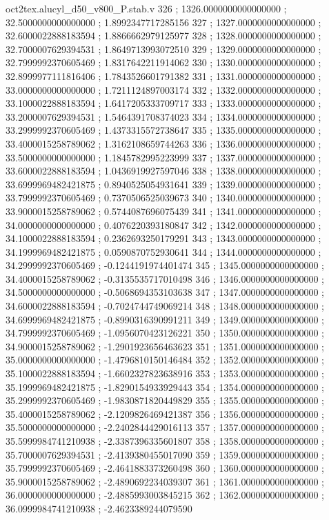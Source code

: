 \begin{filecontents}[overwrite]{oct2tex.alucyl_d50_v800_P.stab.v}
326 ; 1326.0000000000000000 ; 32.5000000000000000 ; 1.8992347717285156
327 ; 1327.0000000000000000 ; 32.6000022888183594 ; 1.8866662979125977
328 ; 1328.0000000000000000 ; 32.7000007629394531 ; 1.8649713993072510
329 ; 1329.0000000000000000 ; 32.7999992370605469 ; 1.8317642211914062
330 ; 1330.0000000000000000 ; 32.8999977111816406 ; 1.7843526601791382
331 ; 1331.0000000000000000 ; 33.0000000000000000 ; 1.7211124897003174
332 ; 1332.0000000000000000 ; 33.1000022888183594 ; 1.6417205333709717
333 ; 1333.0000000000000000 ; 33.2000007629394531 ; 1.5464391708374023
334 ; 1334.0000000000000000 ; 33.2999992370605469 ; 1.4373315572738647
335 ; 1335.0000000000000000 ; 33.4000015258789062 ; 1.3162108659744263
336 ; 1336.0000000000000000 ; 33.5000000000000000 ; 1.1845782995223999
337 ; 1337.0000000000000000 ; 33.6000022888183594 ; 1.0436919927597046
338 ; 1338.0000000000000000 ; 33.6999969482421875 ; 0.8940525054931641
339 ; 1339.0000000000000000 ; 33.7999992370605469 ; 0.7370506525039673
340 ; 1340.0000000000000000 ; 33.9000015258789062 ; 0.5744087696075439
341 ; 1341.0000000000000000 ; 34.0000000000000000 ; 0.4076220393180847
342 ; 1342.0000000000000000 ; 34.1000022888183594 ; 0.2362693250179291
343 ; 1343.0000000000000000 ; 34.1999969482421875 ; 0.0590870752930641
344 ; 1344.0000000000000000 ; 34.2999992370605469 ; -0.1244191974401474
345 ; 1345.0000000000000000 ; 34.4000015258789062 ; -0.3135535717010498
346 ; 1346.0000000000000000 ; 34.5000000000000000 ; -0.5068694353103638
347 ; 1347.0000000000000000 ; 34.6000022888183594 ; -0.7024744749069214
348 ; 1348.0000000000000000 ; 34.6999969482421875 ; -0.8990316390991211
349 ; 1349.0000000000000000 ; 34.7999992370605469 ; -1.0956070423126221
350 ; 1350.0000000000000000 ; 34.9000015258789062 ; -1.2901923656463623
351 ; 1351.0000000000000000 ; 35.0000000000000000 ; -1.4796810150146484
352 ; 1352.0000000000000000 ; 35.1000022888183594 ; -1.6602327823638916
353 ; 1353.0000000000000000 ; 35.1999969482421875 ; -1.8290154933929443
354 ; 1354.0000000000000000 ; 35.2999992370605469 ; -1.9830871820449829
355 ; 1355.0000000000000000 ; 35.4000015258789062 ; -2.1209826469421387
356 ; 1356.0000000000000000 ; 35.5000000000000000 ; -2.2402844429016113
357 ; 1357.0000000000000000 ; 35.5999984741210938 ; -2.3387396335601807
358 ; 1358.0000000000000000 ; 35.7000007629394531 ; -2.4139380455017090
359 ; 1359.0000000000000000 ; 35.7999992370605469 ; -2.4641883373260498
360 ; 1360.0000000000000000 ; 35.9000015258789062 ; -2.4890692234039307
361 ; 1361.0000000000000000 ; 36.0000000000000000 ; -2.4885993003845215
362 ; 1362.0000000000000000 ; 36.0999984741210938 ; -2.4623389244079590

\end{filecontents}
